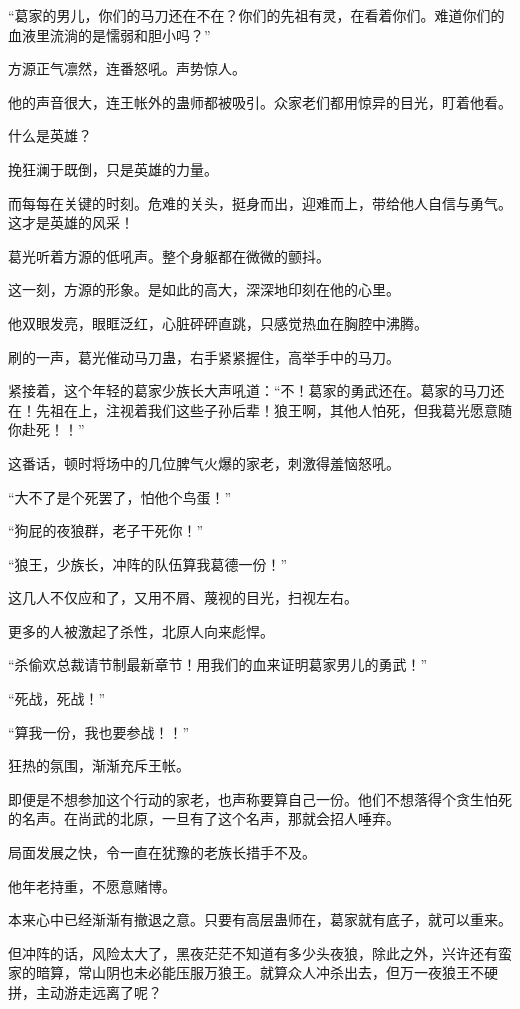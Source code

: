 \begin{this_body}
“葛家的男儿，你们的马刀还在不在？你们的先祖有灵，在看着你们。难道你们的血液里流淌的是懦弱和胆小吗？”

方源正气凛然，连番怒吼。声势惊人。

他的声音很大，连王帐外的蛊师都被吸引。众家老们都用惊异的目光，盯着他看。

什么是英雄？

挽狂澜于既倒，只是英雄的力量。

而每每在关键的时刻。危难的关头，挺身而出，迎难而上，带给他人自信与勇气。这才是英雄的风采！

葛光听着方源的低吼声。整个身躯都在微微的颤抖。

这一刻，方源的形象。是如此的高大，深深地印刻在他的心里。

他双眼发亮，眼眶泛红，心脏砰砰直跳，只感觉热血在胸腔中沸腾。

刷的一声，葛光催动马刀蛊，右手紧紧握住，高举手中的马刀。

紧接着，这个年轻的葛家少族长大声吼道：“不！葛家的勇武还在。葛家的马刀还在！先祖在上，注视着我们这些子孙后辈！狼王啊，其他人怕死，但我葛光愿意随你赴死！！”

这番话，顿时将场中的几位脾气火爆的家老，刺激得羞恼怒吼。

“大不了是个死罢了，怕他个鸟蛋！”

“狗屁的夜狼群，老子干死你！”

“狼王，少族长，冲阵的队伍算我葛德一份！”

这几人不仅应和了，又用不屑、蔑视的目光，扫视左右。

更多的人被激起了杀性，北原人向来彪悍。

“杀偷欢总裁请节制最新章节！用我们的血来证明葛家男儿的勇武！”

“死战，死战！”

“算我一份，我也要参战！！”

狂热的氛围，渐渐充斥王帐。

即便是不想参加这个行动的家老，也声称要算自己一份。他们不想落得个贪生怕死的名声。在尚武的北原，一旦有了这个名声，那就会招人唾弃。

局面发展之快，令一直在犹豫的老族长措手不及。

他年老持重，不愿意赌博。

本来心中已经渐渐有撤退之意。只要有高层蛊师在，葛家就有底子，就可以重来。

但冲阵的话，风险太大了，黑夜茫茫不知道有多少头夜狼，除此之外，兴许还有蛮家的暗算，常山阴也未必能压服万狼王。就算众人冲杀出去，但万一夜狼王不硬拼，主动游走远离了呢？


\end{this_body}
